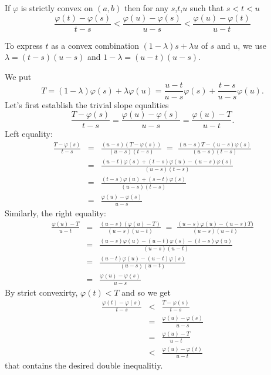 \begin{llem} \label{lem:convex:stu}
If \(\varphi\) is strictly convex on \((a,b)\)
then for any $s$,$t$,$u$ such that \(s<t<u\)
\begin{equation} \label{eq:convex:stu}
\frac{\varphi(t) - \varphi(s)}{t-s}
 < \frac{\varphi(u) - \varphi(s)}{u-s}
 < \frac{\varphi(u) - \varphi(t)}{u-t}
\end{equation}
\end{llem}
\begin{thmproof}
To express $t$ as a convex combination
\((1-\lambda)s + \lambda u\)
of $s$ and $u$, we
use \(\lambda = (t-s)(u-s)\) and
 \(1 - \lambda = (u-t)(u-s)\).

We put
\begin{equation*}
T = (1-\lambda)\varphi(s) + \lambda\varphi(u)
  = \frac{u-t}{u-s} \varphi(s) + \frac{t-s}{u-s} \varphi(u).
\end{equation*}
Let's first establish the trivial slope equalities
\begin{equation} \label{eq:convex:slope}
 \frac{T-\varphi(s)}{t-s}
 = \frac{\varphi(u)-\varphi(s)}{u-s}
 = \frac{\varphi(u) - T}{u-t}.
\end{equation}
Left equality:
\begin{eqnarray*}
 \frac{T-\varphi(s)}{t-s}
 &=& \frac{(u-s)(T-\varphi(s))}{(u-s)(t-s)}
 \;=\; \frac{(u-s)T - (u-s)\varphi(s)}{(u-s)(t-s)} \\
 &=& \frac{(u-t)\varphi(s) + (t-s)\varphi(u) - (u-s)\varphi(s)}{
           (u-s)(t-s)} \\
 &=& \frac{(t-s)\varphi(u) + (s-t)\varphi(s)}{(u-s)(t-s)} \\
 &=& \frac{\varphi(u)-\varphi(s)}{u-s}
\end{eqnarray*}
Similarly, the right equality:
\begin{eqnarray*}
 \frac{\varphi(u) - T}{u-t}
 &=& \frac{(u-s)(\varphi(u)-T)}{(u-s)(u-t)}
 \;=\; \frac{(u-s)\varphi(u) - (u-s)T)}{(u-s)(u-t)} \\
 &=& \frac{(u-s)\varphi(u) - (u-t)\varphi(s) - (t-s)\varphi(u)}{
           (u-s)(u-t)} \\
 &=& \frac{(u-t)\varphi(u) - (u-t)\varphi(s)}{(u-s)(u-t)} \\
 &=& \frac{\varphi(u)-\varphi(s)}{u-s}
\end{eqnarray*}
By strict convexirty, \(\varphi(t)<T\) and so we get
\begin{eqnarray*}
\frac{\varphi(t) - \varphi(s)}{t-s}
 &<& \frac{T - \varphi(s)}{t-s} \\
 &=& \frac{\varphi(u) - \varphi(s)}{u-s} \\
 &=& \frac{\varphi(u) - T}{u-t} \\
 &<& \frac{\varphi(u) - \varphi(t)}{u-t}
\end{eqnarray*}
that contains the desired double inequalitiy.
\end{thmproof}

